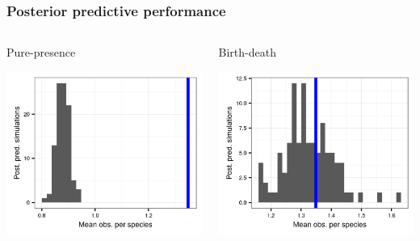 \documentclass{beamer}
\begin{document}
\begin{frame}
  \frametitle{Posterior predictive performance}

  \begin{columns}
    \begin{column}{0.5\textwidth}
      \begin{center}
        Pure-presence

        \includegraphics[height=0.8\textheight,width=\textwidth,keepaspectratio=true]{figure/pred_occ}
      \end{center}
    \end{column}
    \begin{column}{0.5\textwidth}
      \begin{center}
        Birth-death 

        \includegraphics[height=0.8\textheight,width=\textwidth,keepaspectratio=true]{figure/pred_occ_bd}
      \end{center}
    \end{column}
  \end{columns}
\end{frame}
\end{document}
